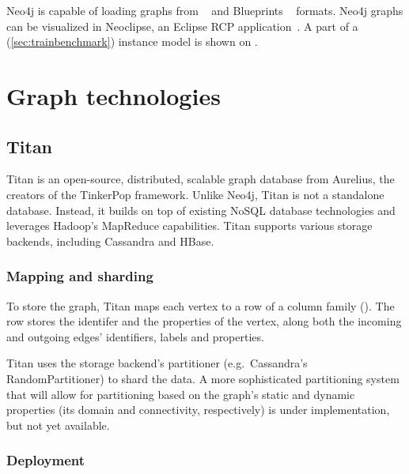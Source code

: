 Neo4j is capable of loading graphs from \graphml{}~\cite{GraphML} and Blueprints \graphson{}~\cite{BlueprintsGraphSON} formats. Neo4j graphs can be visualized in Neoclipse, an Eclipse RCP application~\cite{Neoclipse}. A part of a \tb{} (\autoref{sec:trainbenchmark}) instance model is shown on .



\section{Graph technologies}

\subsection{Titan}
\label{subsec:titan}

Titan %
is an open-source, distributed, scalable graph database from Aurelius, the creators of the TinkerPop framework. Unlike Neo4j, Titan is not a standalone database. Instead, it builds on top of existing NoSQL database technologies and leverages Hadoop's MapReduce capabilities. Titan supports various storage backends, including Cassandra and HBase.


\subsubsection{Mapping and sharding}

To store the graph, Titan maps each vertex to a row of a column family (). The row stores the identifer and the properties of the vertex, along both the incoming and outgoing edges' identifiers, labels and properties.

Titan uses the storage backend's partitioner (e.g.\ Cassandra's RandomPartitioner) to shard the data. A more sophisticated partitioning system that will allow for partitioning based on the graph's static and dynamic properties (its domain and connectivity, respectively) is under implementation, but not yet available.


\subsubsection{Deployment}

